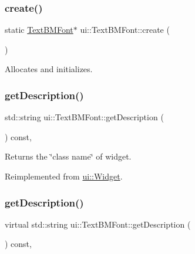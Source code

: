 \subsubsection{\texorpdfstring{create()}{create()}\hspace{0.1cm}{\footnotesize\ttfamily [2/2]}}
{\footnotesize\ttfamily static \hyperlink{classui_1_1TextBMFont}{Text\+B\+M\+Font}$\ast$ ui\+::\+Text\+B\+M\+Font\+::create (\begin{DoxyParamCaption}{ }\end{DoxyParamCaption})\hspace{0.3cm}{\ttfamily [static]}}

Allocates and initializes. \mbox{\label{classui_1_1TextBMFont_ad0de7ec80e5ef916d147a77390e89aba}} 
\subsubsection{\texorpdfstring{get\+Description()}{getDescription()}\hspace{0.1cm}{\footnotesize\ttfamily [1/2]}}
{\footnotesize\ttfamily std\+::string ui\+::\+Text\+B\+M\+Font\+::get\+Description (\begin{DoxyParamCaption}{ }\end{DoxyParamCaption}) const\hspace{0.3cm}{\ttfamily [override]}, {\ttfamily [virtual]}}

Returns the \char`\"{}class name\char`\"{} of widget. 

Reimplemented from \hyperlink{classui_1_1Widget_ad85abdaa9133dc6b8efc32670ae9b93f}{ui\+::\+Widget}.

\mbox{\label{classui_1_1TextBMFont_ab0472d58930e8b0f290e69ac13756353}} 
\subsubsection{\texorpdfstring{get\+Description()}{getDescription()}\hspace{0.1cm}{\footnotesize\ttfamily [2/2]}}
{\footnotesize\ttfamily virtual std\+::string ui\+::\+Text\+B\+M\+Font\+::get\+Description (\begin{DoxyParamCaption}{ }\end{DoxyParamCaption}) const\hspace{0.3cm}{\ttfamily [override]}, {\ttfamily [virtual]}}

